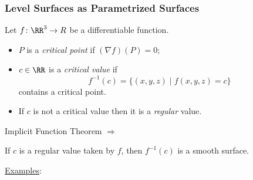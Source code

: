 \begin{frame}
  \frametitle{Level Surfaces as Parametrized Surfaces}

Let $f \colon \RR^3 \to R$ be a differentiable function.
\begin{itemize}
  \item $P$ is a \emph{critical point} if $(\nabla f)(P) = 0$;
  \item $c \in \RR$ is a \emph{critical value} if
%
$$f^{-1}(c) = \{ (x,y,z) \; | \; f(x,y,z) = c\}$$
%
contains a critical point.
\item If $c$ is not a critical value then it is a \emph{regular} value.
\end{itemize}

Implicit Function Theorem $\Longrightarrow$

If $c$ is a regular value taken by $f$, then $f^{-1}(c)$ is a smooth surface.

\underline{Examples}:
 \begin{overlayarea}{\textheight}{5cm}

 \end{overlayarea}
\end{frame}
